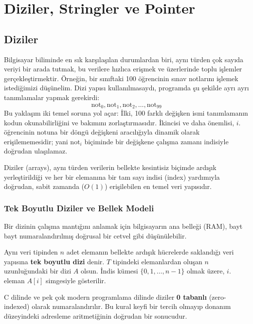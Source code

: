 \chapter[Diziler, Stringler ve Pointer · \textit{Temel}]{Diziler, Stringler ve Pointer}

\section{Diziler}

Bilgisayar biliminde en sık karşılaşılan durumlardan biri, aynı türden çok sayıda veriyi bir arada tutmak, bu verilere hızlıca erişmek ve üzerlerinde toplu işlemler gerçekleştirmektir. Örneğin, bir sınıftaki 100 öğrencinin sınav notlarını işlemek istediğimizi düşünelim. Dizi yapısı kullanılmasaydı, programda şu şekilde ayrı ayrı tanımlamalar yapmak gerekirdi:
\[
\text{not}_0, \text{not}_1, \text{not}_2, \dots, \text{not}_{99}
\]
Bu yaklaşım iki temel soruna yol açar: İlki, 100 farklı değişken ismi tanımlamanın kodun okunabilirliğini ve bakımını zorlaştırmasıdır. İkincisi ve daha önemlisi, $i$. öğrencinin notuna bir döngü değişkeni aracılığıyla dinamik olarak erişilememesidir; yani $\text{not}_i$ biçiminde bir değişkene çalışma zamanı indisiyle doğrudan ulaşılamaz.

Diziler (arrays), aynı türden verilerin bellekte kesintisiz biçimde ardışık yerleştirildiği ve her bir elemanına bir tam sayı indisi (index) yardımıyla doğrudan, sabit zamanda ($O(1)$) erişilebilen en temel veri yapısıdır.

\subsection{Tek Boyutlu Diziler ve Bellek Modeli}

Bir dizinin çalışma mantığını anlamak için bilgisayarın ana belleği (RAM), bayt bayt numaralandırılmış doğrusal bir cetvel gibi düşünülebilir.

\begin{definition}
Aynı veri tipinden $n$ adet elemanın bellekte ardışık hücrelerde saklandığı veri yapısına \textbf{tek boyutlu dizi} denir. $T$ tipindeki elemanlardan oluşan $n$ uzunluğundaki bir dizi $A$ olsun. İndis kümesi $\{0, 1, \dots, n-1\}$ olmak üzere, $i$. eleman $A[i]$ simgesiyle gösterilir.
\end{definition}

C dilinde ve pek çok modern programlama dilinde diziler \textbf{0 tabanlı} (zero-indexed) olarak numaralandırılır. Bu kural keyfi bir tercih olmayıp donanım düzeyindeki adresleme aritmetiğinin doğrudan bir sonucudur.

